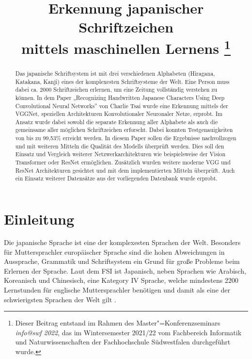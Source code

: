 \documentclass[twoside,a4paper]{IEEEtran}
\begin{document}
\title{Erkennung japanischer Schriftzeichen \\mittels maschinellen Lernens%
    \thanks{%
    Dieser Beitrag entstand im 
    Rahmen des Master"=Konferenzseminars \emph{info@swf 2022}, das im
    Wintersemester 2021/22 vom Fachbereich Informatik und
    Naturwissenschaften der Fachhochschule Südwestfalen
    durchgeführt wurde.}}
\author{
}

\maketitle


\begin{abstract}
Das japanische Schriftsystem ist mit drei verschiedenen Alphabeten (Hiragana, Katakana, Kanji) eines der komplexesten Schriftsysteme der Welt. Eine Person muss dabei ca. 2000 Schriftzeichen erlernen, um eine Zeitung vollständig verstehen zu können. In dem Paper „Recognizing Handwritten Japanese Characters Using Deep Convolutional Neural Networks” von Charlie Tsai wurde eine Erkennung mittels der VGGNet, speziellen Architekturen Konvolutionaler Neuronaler Netze, erprobt. Im Ansatz wurde dabei sowohl die separate Erkennung aller Alphabete als auch die gemeinsame aller möglichen Schriftzeichen erforscht. Dabei konnten Testgenauigkeiten von bis zu 99,53\% erreicht werden. In diesem Paper sollen die Ergebnisse nachvollzogen und mit weiteren Mitteln die Qualität des Modells überprüft werden. Dies soll den Einsatz und Vergleich weiterer Netzwerkarchitekturen wie beispielsweise der Vision Transformer oder ResNet ermöglichen. Zusätzlich wurden weitere moderne VGG und ResNet Architekturen gesichtet und mit dem implementierten Mitteln überprüft. Auch ein Einsatz weiterer Datensätze aus der vorliegenden Datenbank wurde erprobt. 
\end{abstract}


\section{Einleitung}
Die japanische Sprache ist eine der komplexesten Sprachen der Welt. Besonders für Muttersprachler europäischer Sprache sind die hohen Abweichungen in Aussprache, Grammatik und Schriftsystem ein Grund für große Probleme beim Erlernen der Sprache. Laut dem FSI ist Japanisch, neben Sprachen wie Arabisch, Koreanisch und Chinesisch, eine Kategory IV Sprache, welche mindestens 2200 Lernstunden für englische Muttersprachler benötigen und damit als eine der schwierigsten Sprachen der Welt gilt \cite{FSI}.
\end{document}
